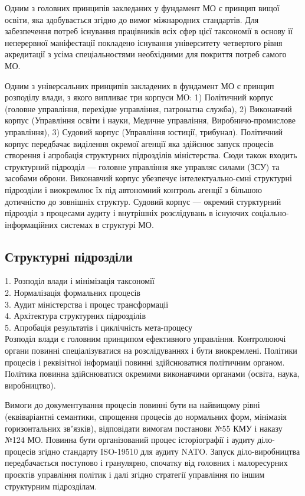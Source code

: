Одним з головних принципів закледаних у фундамент МО є принцип вищої освіти, яка здобувається згідно до вимог міжнародних стандартів. Для забезпечення потреб існування працівників всіх сфер цієї таксономії в основу її неперервної маніфестації покладено існування університету четвертого рівня акредитації з усіма спеціальностями необхідними для покриття потреб самого МО.

Одним з універсальних принципів закладених в фундамент МО є принцип розподілу влади, з якого випливає три корпуси МО: 1) Політичний корпус (головне управління, перехідне управління, патронатна служба), 2) Виконавчий корпус (Управління освіти і науки, Медичне управління, Виробничо-промислове управління), 3) Судовий корпус (Управління юстиції, трибунал). Політичний корпус передбачає виділення окремої агенції яка здійснює запуск процесів створення і апробація структурних підрозділів міністерства. Сюди також входить структурний підрозділ — головне управління яке управляє силами (ЗСУ) та засобами оброни. Виконавчий корпус убезпечує інтелектуально-ємні структурні підрозділи і виокремлює їх під автономний контроль агенції з більшою дотичністю до зовнішніх структур. Судовий корпус — окремий стурктурний підрозділ з процесами аудиту і внутрішніх розслідувань в існуючих соціально-інформаційних системах в структурі МО.

\subsection{Структурні підрозділи}

1. Розподіл влади і мінімізація таксономії \\
2. Нормалізація формальних процесів \\
3. Аудит міністерства і процес трансформації \\
4. Архітектура структурних підрозділів \\
5. Апробація результатів і циклічність мета-процесу \\

Розподіл влади є головним принципом ефективного управління. Контролюючі
органи повинні спеціалізуватися на розслідуваннях і бути виокремлені.
Політики процесів і реквізітної інформації повинні здійснюватися політичним
органом. Політика повинна здійснюватися окремими виконавчими
органами (освіта, наука, виробництво).

Вимоги до документування процесів повинні бути на найвищому рівні (еквіваріантні
семантики, спрощення процесів до нормальних форм, мінімазія горизонтальних
звʼязків), відповідати вимогам постанови №55 КМУ і наказу №124 МО. Повинна
бути організований процес історіографії і аудиту діло-процесів згідно
стандарту ISO-19510 для аудиту NATO. Запуск діло-виробництва передбачається
поступово і гранулярно, спочатку від головних і малоресурних проєктів
управління політик і далі згідно стратегії управління по іншим структурним підрозділам.

